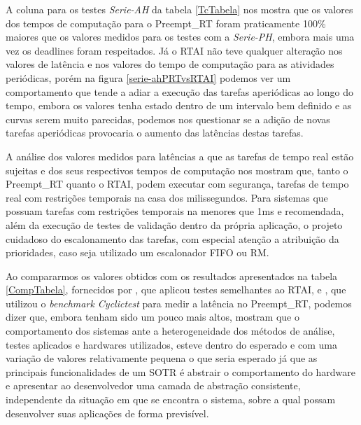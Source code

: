 A coluna para os testes \textit{Serie-AH} da tabela \ref{TcTabela} nos mostra que os valores dos tempos de computação para o Preempt\_RT foram praticamente 100\% maiores que os valores medidos para os testes com a \textit{Serie-PH}, embora mais uma vez os deadlines foram respeitados. Já o RTAI não teve qualquer alteração nos valores de latência e nos valores do tempo de computação para as atividades periódicas, porém na figura \ref{serie-ahPRTvsRTAI} podemos ver um comportamento que tende a adiar a execução das tarefas aperiódicas ao longo do tempo, embora os valores tenha estado dentro de um intervalo bem definido e as curvas serem muito parecidas, podemos nos questionar se a adição de novas tarefas aperiódicas provocaria o aumento das latências destas tarefas.

A análise dos valores medidos para latências a que as tarefas de tempo real estão sujeitas e dos seus respectivos tempos de computação nos mostram que, tanto o Preempt\_RT quanto o RTAI, podem executar com segurança, tarefas de tempo real com restrições temporais na casa dos milissegundos. Para sistemas que possuam tarefas com restrições temporais na menores que 1ms e recomendada, além da execução de testes de validação dentro da própria aplicação, o projeto cuidadoso do escalonamento das tarefas, com especial atenção a atribuição da prioridades, caso seja utilizado um escalonador FIFO ou RM.

Ao compararmos os valores obtidos com os resultados apresentados na tabela \ref{CompTabela}, fornecidos por \cite{Anderson2007}, que aplicou testes semelhantes ao RTAI, e \cite{Litayem2011}, que utilizou o \textit{benchmark Cyclictest} para medir a latência no Preempt\_RT, podemos dizer que, embora tenham sido um pouco mais altos, mostram que o comportamento dos sistemas ante a heterogeneidade dos métodos de análise, testes aplicados e hardwares utilizados, esteve dentro do esperado e com uma variação de valores relativamente pequena o que seria esperado já que as principais funcionalidades de um SOTR é abstrair o comportamento do hardware e apresentar ao desenvolvedor uma camada de abstração consistente, independente da situação em que se encontra o sistema, sobre a qual possam desenvolver suas aplicações de forma previsível.

